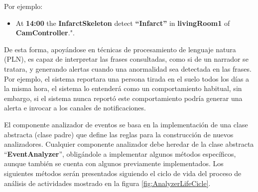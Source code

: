         Por ejemplo:
        
        \begin{itemize}
            \item At \textbf{14:00} the \textbf{InfarctSkeleton} detect \textbf{``Infarct''} in \textbf{livingRoom1} of \textbf{CamController}.".
        \end{itemize}
        
        
        De esta forma, apoyándose en técnicas de procesamiento de lenguaje natura (PLN), es capaz de interpretar las frases consultadas, como si de un narrador se tratara, y generando alertas cuando una anormalidad sea detectada en las frases. Por ejemplo, el sistema reportara una persona tirada en el suelo todos los días a la misma hora, el sistema lo entenderá como un comportamiento habitual, sin embargo, si el sistema nunca reportó este comportamiento podría generar una alerta e invocar a los canales de notificaciones.
        
        El componente analizador de eventos se basa en la implementación de una clase abstracta (clase padre) que define las reglas para la construcción de nuevos analizadores. Cualquier componente analizador debe heredar de la clase abstracta ``\textbf{EventAnalyzer}'', obligándole a implementar algunos métodos específicos, aunque también se cuenta con algunos previamente implementados. Los siguientes métodos serán presentados siguiendo el ciclo de vida del proceso de análisis de actividades mostrado en la figura \ref{fig:AnalyzerLifeCicle}.

